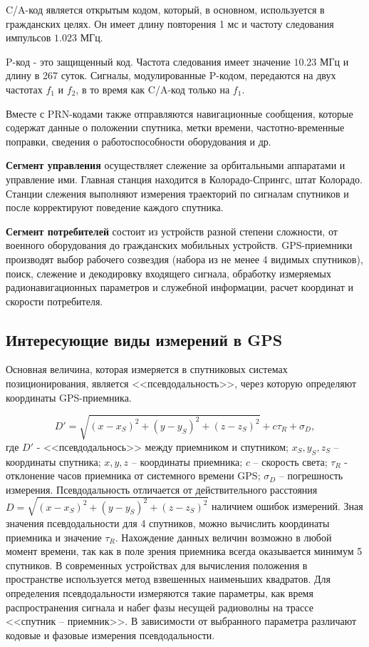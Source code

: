 \documentclass[a4paper]{article}
\begin{document}
C/A-код является открытым кодом, который, в основном, используется в гражданских целях. Он имеет длину повторения 1 мс и частоту следования импульсов $1.023 \text{ МГц}$.

P-код - это защищенный код. Частота следования имеет значение $10.23 \text{ МГц}$ и длину в 267 суток. Сигналы, модулированные P-кодом, передаются на двух частотах $f_1$ и $f_2$, в то время как C/A-код только на $f_1$.

Вместе с PRN-кодами также отправляются навигационные сообщения, которые содержат данные о положении спутника, метки времени, частотно-временные поправки, сведения о работоспособности оборудования и др.

\textbf{Сегмент управления} осуществляет слежение за орбитальными аппаратами и управление ими. Главная станция находится в Колорадо-Спрингс, штат Колорадо. Станции слежения выполняют измерения траекторий по сигналам спутников и после корректируют поведение каждого спутника.

\textbf{Сегмент потребителей} состоит из устройств разной степени сложности, от военного оборудования до гражданских мобильных устройств. GPS-приемники производят выбор рабочего созвездия (набора из не менее 4 видимых спутников), поиск, слежение и декодировку входящего сигнала, обработку измеряемых радионавигационных параметров и служебной информации, расчет координат и скорости потребителя.

\newpage
\subsection{Интересующие виды измерений в GPS}
Основная величина, которая измеряется в спутниковых системах позиционирования, является <<псевдодальность>>, через которую определяют координаты GPS-приемника.

\begin{equation}
D' = \sqrt{(x - x_S)^2 + (y - y_S)^2 + (z - z_S)^2} + c\tau_R +\sigma_D,
\end{equation}
где $D'$ - <<псевдодальнось>> между приемником и спутником; $x_S, y_S, z_S$ -- координаты спутника; $x, y, z$ -- координаты приемника; $c$ -- скорость света; $\tau_R$ - отклонение часов приемника от системного времени GPS; $\sigma_D$ -- погрешность измерения. 
Псевдодальность отличается от действительного расстояния $D = \sqrt{(x - x_S) ^ 2 + (y - y_S) ^ 2 + (z - z_S) ^ 2}$ наличием ошибок измерений. 
Зная значения псевдодальности для 4 спутников, можно вычислить координаты приемника и значение $\tau_R$. Нахождение данных величин возможно в любой момент времени, так как в поле зрения приемника всегда оказывается минимум 5 спутников. В современных устройствах для вычисления положения в пространстве используется метод взвешенных наименьших квадратов. Для определения псевдодальности измеряются такие параметры, как время распространения сигнала и набег фазы несущей радиоволны на трассе <<спутник -- приемник>>. В зависимости от выбранного параметра различают кодовые и фазовые измерения псевдодальности.
\end{document}
